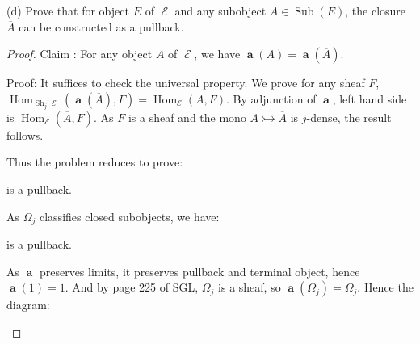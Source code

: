 \documentclass[a4paper]{article}
\DeclareMathOperator{\Hom}{\text {Hom}}
\DeclareMathOperator{\Sub}{\text {Sub}}
\DeclareMathOperator{\Sh}{\text {Sh}}
\DeclareMathOperator{\E}{\mathcal E}
\DeclareMathOperator{\abf}{\mathbf a}
\begin{document}
(d) Prove that for object $E$ of $\E$ and any subobject $A\in\Sub(E)$, the closure $\overline{A}$ can be constructed as a pullback.
\begin{center}
\end{center}
\begin{proof}
    Claim : For any object $A$ of $\E$, we have $\abf(A)=\abf(\overline{A})$.

    Proof: It suffices to check the universal property. We prove for any sheaf $F$, $\Hom_{\Sh_j\E}(\abf(\overline{A}),F) = \Hom_{\E}(A,F)$. By adjunction of $\abf$, left hand side is $\Hom_{\E}(\overline{A},F)$. As $F$ is a sheaf and the mono $A\rightarrowtail \overline{A}$ is $j$-dense, the result follows.

    Thus the problem reduces to prove:

    \begin{center}
    \end{center}

    is a pullback.

    As $\Omega_j$ classifies closed subobjects, we have:
    \begin{center}
    \end{center}

    is a pullback.

    As $\abf$ preserves limits, it preserves pullback and terminal object, hence $\abf(1)=1$. And by page 225 of SGL, $\Omega_j$ is a sheaf, so $\abf(\Omega_j)=\Omega_j$. Hence the diagram:

    \begin{center}
    \end{center}


\end{proof}
\end{document}
